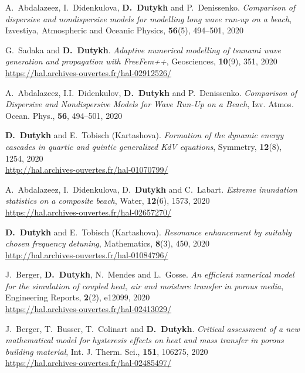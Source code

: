 \begin{etaremune}
  \item A.~Abdalazeez, I.~Didenkulova, \textbf{D.~Dutykh} and P.~Denissenko. \textit{Comparison of dispersive and nondispersive models for modelling long wave run-up on a beach}, Izvestiya, Atmospheric and Oceanic Physics, \textbf{56}(5), 494--501, 2020 %
  
  \item G.~Sadaka and \textbf{D.~Dutykh}. \textit{Adaptive numerical modelling of tsunami wave generation and propagation with FreeFem++}, Geosciences, \textbf{10}(9), 351, 2020 \\ %
  \url{https://hal.archives-ouvertes.fr/hal-02912526/}
  
  \item A.~Abdalazeez, I.I.~Didenkulov, \textbf{D.~Dutykh} and P.~Denissenko. \textit{Comparison of Dispersive and Nondispersive Models for Wave Run-Up on a Beach}, Izv. Atmos. Ocean. Phys., \textbf{56}, 494--501, 2020 %
  
  \item \textbf{D.~Dutykh} and E.~Tobisch (Kartashova). \textit{Formation of the dynamic energy cascades in quartic and quintic generalized KdV equations}, Symmetry, \textbf{12}(8), 1254, 2020 \\ %
  \url{http://hal.archives-ouvertes.fr/hal-01070799/}
  
  \item A.~Abdalazeez, I.~Didenkulova, D.~\textbf{Dutykh} and C.~Labart. \textit{Extreme inundation statistics on a composite beach}, Water, \textbf{12}(6), 1573, 2020 \\ %
  \url{https://hal.archives-ouvertes.fr/hal-02657270/}
  
  \item \textbf{D.~Dutykh} and E.~Tobisch (Kartashova). \textit{Resonance enhancement by suitably chosen frequency detuning}, Mathematics, \textbf{8}(3), 450, 2020 \\ %
  \url{http://hal.archives-ouvertes.fr/hal-01084796/}
  
  \item J.~Berger, \textbf{D.~Dutykh}, N.~Mendes and L.~Gosse. \textit{An efficient numerical model for the simulation of coupled heat, air and moisture transfer in porous media}, Engineering Reports, \textbf{2}(2), e12099, 2020 \\ %
  \url{https://hal.archives-ouvertes.fr/hal-02413029/}
  
  \item J.~Berger, T.~Busser, T.~Colinart and \textbf{D.~Dutykh}. \textit{Critical assessment of a new mathematical model for hysteresis effects on heat and mass transfer in porous building material}, Int. J. Therm. Sci., \textbf{151}, 106275, 2020 \\ %
  \url{https://hal.archives-ouvertes.fr/hal-02485497/}
  

\end{etaremune}
